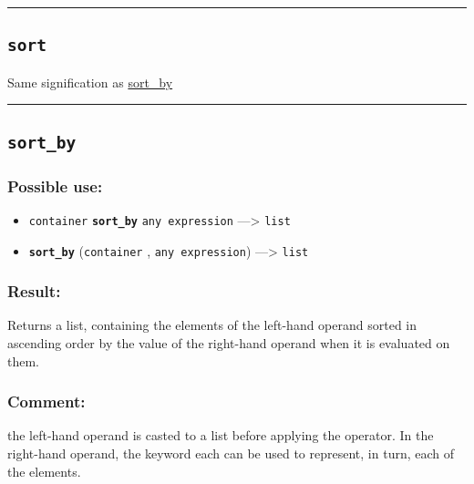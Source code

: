 \documentclass[]{book}
\providecommand{\tightlist}{%
  \setlength{\itemsep}{0pt}\setlength{\parskip}{0pt}}
\theoremstyle{definition}
\theoremstyle{definition}
\theoremstyle{definition}
\theoremstyle{remark}
\begin{document}
\begin{center}\rule{0.5\linewidth}{\linethickness}\end{center}

\subsection{\texorpdfstring{\texttt{sort}}{sort}}\label{sort}

Same signification as \href{OperatorsSZ\#sort_by}{sort\_by}

\begin{center}\rule{0.5\linewidth}{\linethickness}\end{center}

\subsection{\texorpdfstring{\texttt{sort\_by}}{sort\_by}}\label{sort_by}

\subsubsection{Possible use:}\label{possible-use-486}

\begin{itemize}
\tightlist
\item
  \texttt{container} \textbf{\texttt{sort\_by}} \texttt{any\ expression}
  ---\textgreater{} \texttt{list}
\item
  \textbf{\texttt{sort\_by}} (\texttt{container} ,
  \texttt{any\ expression}) ---\textgreater{} \texttt{list}
\end{itemize}

\subsubsection{Result:}\label{result-470}

Returns a list, containing the elements of the left-hand operand sorted
in ascending order by the value of the right-hand operand when it is
evaluated on them.

\subsubsection{Comment:}\label{comment-89}

the left-hand operand is casted to a list before applying the operator.
In the right-hand operand, the keyword each can be used to represent, in
turn, each of the elements.
\end{document}
